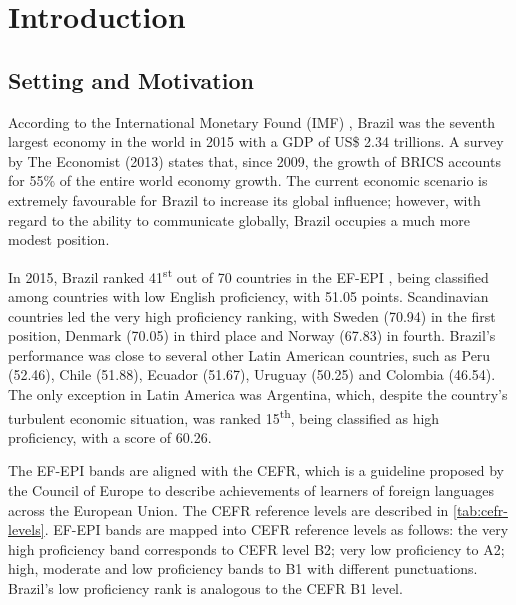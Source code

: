 \chapter{Introduction}\label{ch:introduction}

\section*{Setting and Motivation}

According to the International Monetary Found (IMF) \cite{IMF2015}, Brazil was the seventh largest economy in the world in 2015 with a GDP of US\$ 2.34 trillions. A survey by The Economist (2013) states that, since 2009, the growth of BRICS accounts for 55\% of the entire world economy growth. The current economic scenario is extremely favourable for Brazil to increase its global influence; however, with regard to the ability to communicate globally, Brazil occupies a much more modest position. 

In 2015, Brazil ranked 41\textsuperscript{st} out of 70 countries in the \ac{EF-EPI} \cite{EF2015}, being classified among countries with low English proficiency, with 51.05 points. Scandinavian countries led the very high proficiency ranking, with Sweden (70.94) in the first position, Denmark (70.05) in third place and Norway (67.83) in fourth. Brazil's performance was close to several other Latin American countries, such as Peru (52.46), Chile (51.88), Ecuador (51.67), Uruguay (50.25) and Colombia (46.54). The only exception in Latin America was Argentina, which, despite the country's turbulent economic situation, was ranked 15\textsuperscript{th}, being classified as high proficiency, with a score of 60.26.

The \ac{EF-EPI} bands are aligned with the \ac{CEFR}, which is a guideline proposed by the Council of Europe to describe achievements of learners of foreign languages across the European Union. The \ac{CEFR} reference levels are described in \autoref{tab:cefr-levels}. \ac{EF-EPI} bands are mapped into \ac{CEFR} reference levels as follows: the very high proficiency band corresponds to \ac{CEFR} level B2; very low proficiency to A2; high, moderate and low proficiency bands to B1 with different punctuations. Brazil's low proficiency rank is analogous to the \ac{CEFR} B1 level. 

